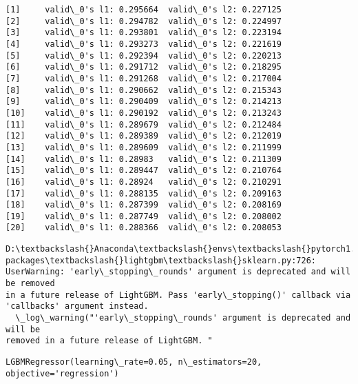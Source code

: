 \documentclass[11pt]{article}
\makeatletter
\newcommand{\boxspacing}{\kern\kvtcb@left@rule\kern\kvtcb@boxsep}
\newcommand{\prompt}[4]{
        \ttfamily\llap{{\color{#2}[#3]:\hspace{3pt}#4}}\vspace{-\baselineskip}
    }
\makeatother
\begin{document}
    \begin{Verbatim}[commandchars=\\\{\}]
[1]     valid\_0's l1: 0.295664  valid\_0's l2: 0.227125
[2]     valid\_0's l1: 0.294782  valid\_0's l2: 0.224997
[3]     valid\_0's l1: 0.293801  valid\_0's l2: 0.223194
[4]     valid\_0's l1: 0.293273  valid\_0's l2: 0.221619
[5]     valid\_0's l1: 0.292394  valid\_0's l2: 0.220213
[6]     valid\_0's l1: 0.291712  valid\_0's l2: 0.218295
[7]     valid\_0's l1: 0.291268  valid\_0's l2: 0.217004
[8]     valid\_0's l1: 0.290662  valid\_0's l2: 0.215343
[9]     valid\_0's l1: 0.290409  valid\_0's l2: 0.214213
[10]    valid\_0's l1: 0.290192  valid\_0's l2: 0.213243
[11]    valid\_0's l1: 0.289679  valid\_0's l2: 0.212484
[12]    valid\_0's l1: 0.289389  valid\_0's l2: 0.212019
[13]    valid\_0's l1: 0.289609  valid\_0's l2: 0.211999
[14]    valid\_0's l1: 0.28983   valid\_0's l2: 0.211309
[15]    valid\_0's l1: 0.289447  valid\_0's l2: 0.210764
[16]    valid\_0's l1: 0.28924   valid\_0's l2: 0.210291
[17]    valid\_0's l1: 0.288135  valid\_0's l2: 0.209163
[18]    valid\_0's l1: 0.287399  valid\_0's l2: 0.208169
[19]    valid\_0's l1: 0.287749  valid\_0's l2: 0.208002
[20]    valid\_0's l1: 0.288366  valid\_0's l2: 0.208053
    \end{Verbatim}

    \begin{Verbatim}[commandchars=\\\{\}]
D:\textbackslash{}Anaconda\textbackslash{}envs\textbackslash{}pytorch1.0\_gpu\textbackslash{}lib\textbackslash{}site-packages\textbackslash{}lightgbm\textbackslash{}sklearn.py:726:
UserWarning: 'early\_stopping\_rounds' argument is deprecated and will be removed
in a future release of LightGBM. Pass 'early\_stopping()' callback via
'callbacks' argument instead.
  \_log\_warning("'early\_stopping\_rounds' argument is deprecated and will be
removed in a future release of LightGBM. "
    \end{Verbatim}

            \begin{tcolorbox}[breakable, size=fbox, boxrule=.5pt, pad at break*=1mm, opacityfill=0]
\prompt{Out}{outcolor}{136}{\boxspacing}
\begin{Verbatim}[commandchars=\\\{\}]
LGBMRegressor(learning\_rate=0.05, n\_estimators=20, objective='regression')
\end{Verbatim}
\end{tcolorbox}
        
\end{document}
